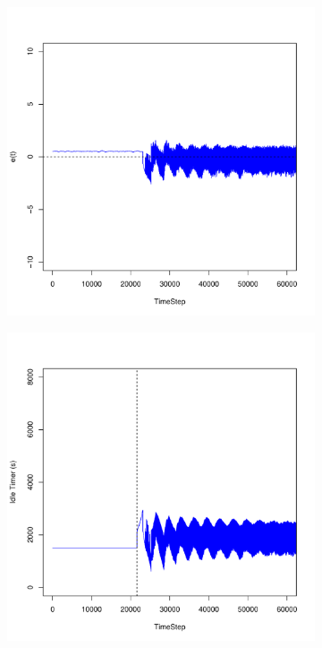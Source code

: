 \documentclass[a4j]{ujarticle}
\begin{document}
\begin{figure}[htbp]
 \centering
 \begin{subfigure}{0.49\hsize}
   \centering
   \includegraphics[width=1.0\hsize]{scenario_6_e_86400_345600_1-8_0-00045_1800_0_ideal.pdf}
   \label{subfig:scenario_6_e_86400_345600_1-8_0-00045_1800_0_ideal}
 \end{subfigure}
 \begin{subfigure}{0.49\hsize}
   \centering
   \includegraphics[width=1.0\hsize]{scenario_6_idleTimer_86400_345600_1-8_0-00045_1800_0_ideal.pdf}

\end{subfigure}
\end{figure}
\end{document}
